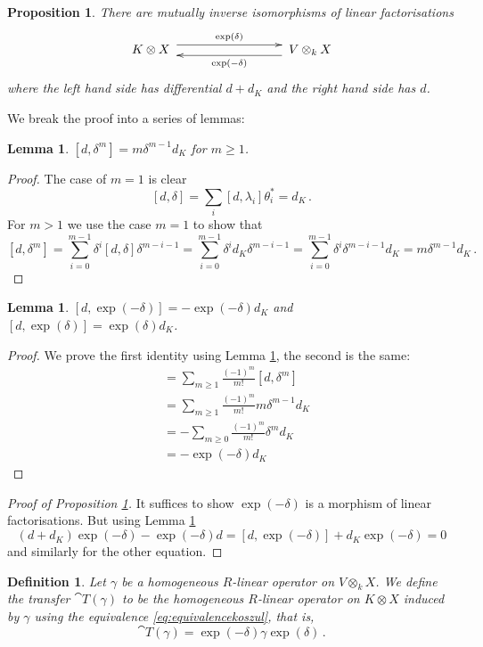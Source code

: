 \documentclass[english,letter paper,12pt,leqno]{article}
\newtheorem{proposition}[theorem]{Proposition}
\newtheorem{lemma}[theorem]{Lemma}
\theoremstyle{example}
\newtheorem{definition}[theorem]{Definition}
\numberwithin{equation}{section}
\def\be{\begin{equation}}
\def\ee{\end{equation}}
\begin{document}
\begin{proposition}\label{prop:equivalencekoszul} There are mutually inverse isomorphisms of linear factorisations
\be\label{eq:equivalencekoszul}
\xymatrix@C+5pc{ K \otimes X\; \ar@<1ex>[r]^-{ \exp(\delta) } & \;V \otimes_k X \ar@<1ex>[l]^-{ \exp(-\delta) } }
\ee
where the left hand side has differential $d + d_K$ and the right hand side has $d$.
\end{proposition}

We break the proof into a series of lemmas:

\begin{lemma}\label{lemma:pert1} $[d, \delta^m] = m \delta^{m-1} d_K$ for $m \ge 1$.
\end{lemma}
\begin{proof}
The case of $m = 1$ is clear
\[
[d, \delta] = \sum_i [d, \lambda_i] \theta_i^* = d_K\,.
\]
For $m > 1$ we use the case $m = 1$ to show that
\[
[ d, \delta^m ] = \sum_{i=0}^{m-1} \delta^i [d, \delta] \delta^{m-i-1} = \sum_{i=0}^{m-1} \delta^i d_K \delta^{m-i-1} = \sum_{i=0}^{m-1} \delta^i \delta^{m-i-1} d_K = m \delta^{m-1} d_K\,.
\]
\end{proof}

\begin{lemma}\label{lemma:pert2} $[ d, \exp(-\delta) ] = - \exp(-\delta) d_K$ and $[ d, \exp(\delta) ] = \exp(\delta) d_K$.
\end{lemma}
\begin{proof}
We prove the first identity using Lemma \ref{lemma:pert1}, the second is the same:
\begin{align*}
[d, \exp(-\delta)] &= \sum_{m \ge 1} \frac{(-1)^m}{m!} [ d, \delta^m ]\\
&= \sum_{m \ge 1} \frac{(-1)^m}{m!} m \delta^{m-1} d_K\\
&= - \sum_{m \ge 0} \frac{(-1)^m}{m!} \delta^m d_K\\
&= - \exp(-\delta) d_K
\end{align*}
\end{proof}

\begin{proof}[Proof of Proposition \ref{prop:equivalencekoszul}]
It suffices to show $\exp(-\delta)$ is a morphism of linear factorisations. But using Lemma \ref{lemma:pert2}
\[
(d + d_K) \exp(-\delta) - \exp(-\delta) d = [d, \exp(-\delta)] + d_K \exp(-\delta) = 0
\]
and similarly for the other equation.
\end{proof}

\begin{definition}\label{defn:transfer_contract} Let $\gamma$ be a homogeneous $R$-linear operator on $V \otimes_k X$. We define the \textsl{transfer} $\cat{T}(\gamma)$ to be the homogeneous $R$-linear operator on $K \otimes X$ induced by $\gamma$ using the equivalence \eqref{eq:equivalencekoszul}, that is,
\be
\cat{T}(\gamma) = \exp(-\delta) \gamma \exp(\delta)\,.
\ee
\end{definition}
\end{document}

